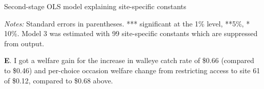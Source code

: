 \documentclass[12pt]{article}
\begin{document}
\singlespace
\begin{threeparttable}[h]  
\caption{Second-stage OLS model explaining site-specific constants}
{\label{tab:assgn1_table17_4D}}
\small

\begin{tablenotes}
\footnotesize
\item \emph{Notes:} Standard errors in parentheses. *** significant at the 1\% level, **5\%, * 10\%.   Model 3 was estimated with 99 site-specific constants which are suppressed from output.\\
\end{tablenotes}
\end{threeparttable}
\doublespace

\textbf{E}. I got a welfare gain for the increase in walleye catch rate of \$0.66 (compared to \$0.46) and  per-choice occasion welfare change from restricting access to site 61 of \$0.12, compared to \$0.68 above.  
\end{document}
